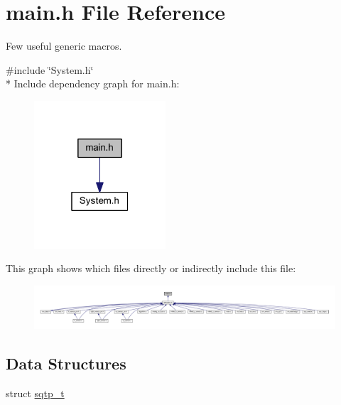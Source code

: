 \hypertarget{a00033}{\section{main.\+h File Reference}
\label{a00033}
}


Few useful generic macros.  


{\ttfamily \#include \char`\"{}System.\+h\char`\"{}}\\*
Include dependency graph for main.\+h\+:\nopagebreak
\begin{figure}[H]
\begin{center}
\leavevmode
\includegraphics[width=139pt]{d1/db0/a00945}
\end{center}
\end{figure}
This graph shows which files directly or indirectly include this file\+:\nopagebreak
\begin{figure}[H]
\begin{center}
\leavevmode
\includegraphics[width=350pt]{da/d40/a00946}
\end{center}
\end{figure}
\subsection*{Data Structures}
\begin{DoxyCompactItemize}
\item 
struct \hyperlink{a00033_d3/d95/a00779}{sqtp\+\_\+t}
\end{DoxyCompactItemize}

